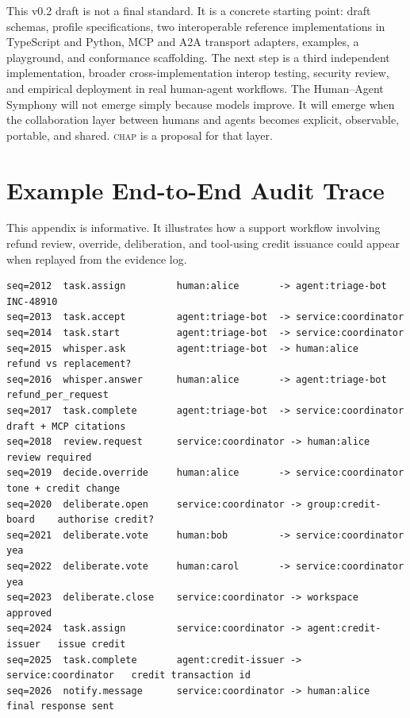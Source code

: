 \documentclass[11pt]{article}
\newcommand{\chap}{\textsc{chap}}
\begin{document}
This v0.2 draft is not a final standard. It is a concrete starting point: draft schemas, profile specifications, two interoperable reference implementations in TypeScript and Python, MCP and A2A transport adapters, examples, a playground, and conformance scaffolding. The next step is a third independent implementation, broader cross-implementation interop testing, security review, and empirical deployment in real human-agent workflows. The Human--Agent Symphony will not emerge simply because models improve. It will emerge when the collaboration layer between humans and agents becomes explicit, observable, portable, and shared. \chap{} is a proposal for that layer.

\appendix

\section{Example End-to-End Audit Trace}
\label{app:audit-trace}

This appendix is informative. It illustrates how a support workflow involving refund review, override, deliberation, and tool-using credit issuance could appear when replayed from the evidence log.

\begin{lstlisting}[caption={Illustrative \chap{} audit replay.},label={lst:audittrace}]
seq=2012  task.assign         human:alice       -> agent:triage-bot       INC-48910
seq=2013  task.accept         agent:triage-bot  -> service:coordinator
seq=2014  task.start          agent:triage-bot  -> service:coordinator
seq=2015  whisper.ask         agent:triage-bot  -> human:alice            refund vs replacement?
seq=2016  whisper.answer      human:alice       -> agent:triage-bot       refund_per_request
seq=2017  task.complete       agent:triage-bot  -> service:coordinator    draft + MCP citations
seq=2018  review.request      service:coordinator -> human:alice          review required
seq=2019  decide.override     human:alice       -> service:coordinator    tone + credit change
seq=2020  deliberate.open     service:coordinator -> group:credit-board    authorise credit?
seq=2021  deliberate.vote     human:bob         -> service:coordinator    yea
seq=2022  deliberate.vote     human:carol       -> service:coordinator    yea
seq=2023  deliberate.close    service:coordinator -> workspace            approved
seq=2024  task.assign         service:coordinator -> agent:credit-issuer   issue credit
seq=2025  task.complete       agent:credit-issuer -> service:coordinator   credit transaction id
seq=2026  notify.message      service:coordinator -> human:alice           final response sent
\end{lstlisting}
\end{document}
